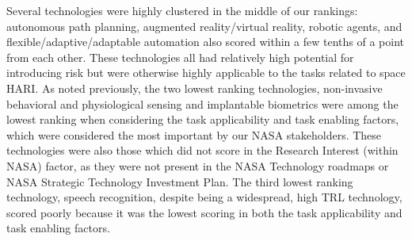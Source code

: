 Several technologies were highly clustered in the middle of our rankings: autonomous path planning, augmented reality/virtual reality, robotic agents, and flexible/adaptive/adaptable automation also scored within a few tenths of a point from each other. These technologies all had relatively high potential for introducing risk but were otherwise highly applicable to the tasks related to space HARI. As noted previously, the two lowest ranking technologies, non-invasive behavioral and physiological sensing and implantable biometrics were among the lowest ranking when considering the task applicability and task enabling factors, which were considered the most important by our NASA stakeholders. These technologies were also those which did not score in the Research Interest (within NASA) factor, as they were not present in the NASA Technology roadmaps or NASA Strategic Technology Investment Plan. The third lowest ranking technology, speech recognition, despite being a widespread, high TRL technology, scored poorly because it was the lowest scoring in both the task applicability and task enabling factors.



